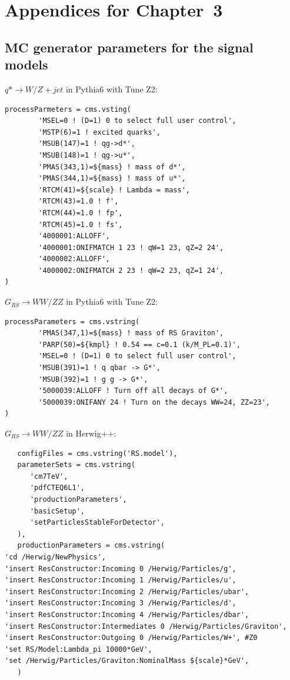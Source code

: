 \chapter{Appendices for Chapter~3}

\section{MC generator parameters for the signal models}
$q* \to W/Z + jet$ in Pythia6 with Tune Z2:
\begin{verbatim}
processParmeters = cms.vsting(
        'MSEL=0 ! (D=1) 0 to select full user control',
        'MSTP(6)=1 ! excited quarks',
        'MSUB(147)=1 ! qg->d*',
        'MSUB(148)=1 ! qg->u*',
        'PMAS(343,1)=${mass} ! mass of d*',
        'PMAS(344,1)=${mass} ! mass of u*',
        'RTCM(41)=${scale} ! Lambda = mass',
        'RTCM(43)=1.0 ! f',
        'RTCM(44)=1.0 ! fp',
        'RTCM(45)=1.0 ! fs',
        '4000001:ALLOFF',
        '4000001:ONIFMATCH 1 23 ! qW=1 23, qZ=2 24',
        '4000002:ALLOFF',
        '4000002:ONIFMATCH 2 23 ! qW=2 23, qZ=1 24',
)
\end{verbatim}

$G_{RS} \to WW/ZZ$ in Pythia6 with Tune Z2:
\begin{verbatim}
processParameters = cms.vstring(
        'PMAS(347,1)=${mass} ! mass of RS Graviton',
        'PARP(50)=${kmpl} ! 0.54 == c=0.1 (k/M_PL=0.1)',
        'MSEL=0 ! (D=1) 0 to select full user control',
        'MSUB(391)=1 ! q qbar -> G*',
        'MSUB(392)=1 ! g g -> G*',
        '5000039:ALLOFF ! Turn off all decays of G*',
        '5000039:ONIFANY 24 ! Turn on the decays WW=24, ZZ=23',
)
\end{verbatim}

$G_{RS} \to WW/ZZ$ in Herwig++:
\begin{verbatim}
   configFiles = cms.vstring('RS.model'),
   parameterSets = cms.vstring(
      'cm7TeV',
      'pdfCTEQ6L1',
      'productionParameters',
      'basicSetup',
      'setParticlesStableForDetector',
   ),
   productionParameters = cms.vstring(
'cd /Herwig/NewPhysics',
'insert ResConstructor:Incoming 0 /Herwig/Particles/g',
'insert ResConstructor:Incoming 1 /Herwig/Particles/u',
'insert ResConstructor:Incoming 2 /Herwig/Particles/ubar',
'insert ResConstructor:Incoming 3 /Herwig/Particles/d',
'insert ResConstructor:Incoming 4 /Herwig/Particles/dbar',
'insert ResConstructor:Intermediates 0 /Herwig/Particles/Graviton',
'insert ResConstructor:Outgoing 0 /Herwig/Particles/W+', #Z0
'set RS/Model:Lambda_pi 10000*GeV',
'set /Herwig/Particles/Graviton:NominalMass ${scale}*GeV',
   )
\end{verbatim}

